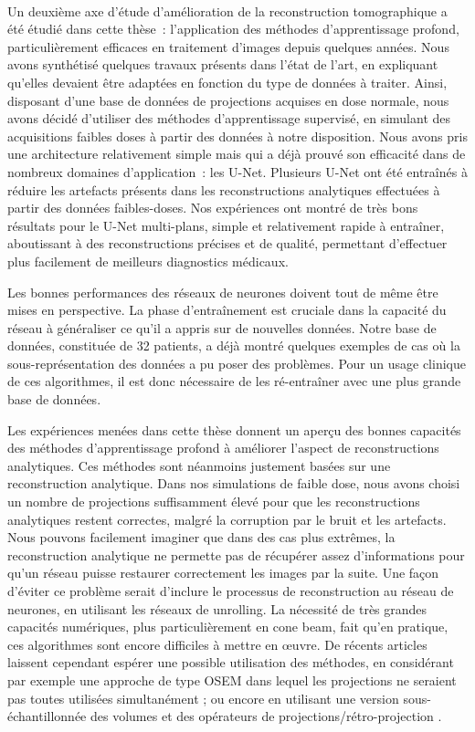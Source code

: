 \paragraph{} Un deuxième axe d'étude d'amélioration de la reconstruction tomographique a été étudié dans cette thèse~: l'application des méthodes d'apprentissage profond, particulièrement efficaces en traitement d'images depuis quelques années. Nous avons synthétisé quelques travaux présents dans l'état de l'art, en expliquant qu'elles devaient être adaptées en fonction du type de données à traiter. Ainsi, disposant d'une base de données de projections acquises en dose normale, nous avons décidé d'utiliser des méthodes d'apprentissage supervisé, en simulant des acquisitions faibles doses à partir des données à notre disposition. Nous avons pris une architecture relativement simple mais qui a déjà prouvé son efficacité dans de nombreux domaines d'application~: les U-Net. Plusieurs U-Net ont été entraînés à réduire les artefacts présents dans les reconstructions analytiques effectuées à partir des données faibles-doses. Nos expériences ont montré de très bons résultats pour le U-Net multi-plans, simple et relativement rapide à entraîner, aboutissant à des reconstructions précises et de qualité, permettant d'effectuer plus facilement de meilleurs diagnostics médicaux.

Les bonnes performances des réseaux de neurones doivent tout de même être mises en perspective. La phase d'entraînement est cruciale dans la capacité du réseau à généraliser ce qu'il a appris sur de nouvelles données. Notre base de données, constituée de 32 patients, a déjà montré quelques exemples de cas où la sous-représentation des données a pu poser des problèmes. Pour un usage clinique de ces algorithmes, il est donc nécessaire de les ré-entraîner avec une plus grande base de données. 

Les expériences menées dans cette thèse donnent un aperçu des bonnes capacités des méthodes d'apprentissage profond à améliorer l'aspect de reconstructions analytiques. Ces méthodes sont néanmoins justement basées sur une reconstruction analytique. Dans nos simulations de faible dose, nous avons choisi un nombre de projections suffisamment élevé pour que les reconstructions analytiques restent correctes, malgré la corruption par le bruit et les artefacts. Nous pouvons facilement imaginer que dans des cas plus extrêmes, la reconstruction analytique ne permette pas de récupérer assez d'informations pour qu'un réseau puisse restaurer correctement les images par la suite. Une façon d'éviter ce problème serait d'inclure le processus de reconstruction au réseau de neurones, en utilisant les réseaux de unrolling. La nécessité de très grandes capacités numériques, plus particulièrement en cone beam, fait qu'en pratique, ces algorithmes sont encore difficiles à mettre en \oe uvre. De récents articles laissent cependant espérer une possible utilisation des méthodes, en considérant par exemple une approche de type OSEM dans lequel les projections ne seraient pas toutes utilisées simultanément  ; ou encore en utilisant une version sous-échantillonnée des volumes et des opérateurs de projections/rétro-projection .

